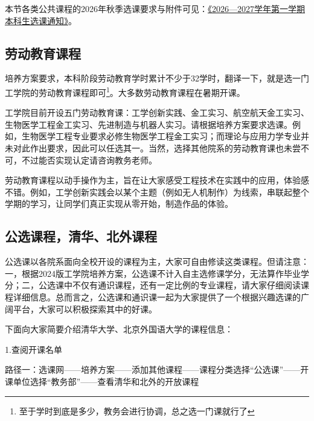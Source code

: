 \documentclass[11pt,oneside]{book}
\begin{document}
本节各类公共课程的2026年秋季选课要求与附件可见：\href{https://dean.pku.edu.cn/web/notice_details.php?id=751}{《2026—2027学年第一学期本科生选课通知》}。

\subsection{劳动教育课程}
培养方案要求，本科阶段劳动教育学时累计不少于32学时，翻译一下，就是选一门工学院的劳动教育课程即可\footnote{至于学时到底是多少，教务会进行协调，总之选一门课就行了}。大多数劳动教育课程在暑期开课。

\vspace{10pt}

工学院目前开设五门劳动教育课：工学创新实践、金工实习、航空航天金工实习、生物医学工程金工实习、先进制造与机器人实习。请根据培养方案要求选课。例如，生物医学工程专业要求必修生物医学工程金工实习；而理论与应用力学专业并未对此作出要求，因此可以任选其一。当然，选择其他院系的劳动教育课也未尝不可，不过能否实现认定请咨询教务老师。

\vspace{10pt}

劳动教育课程以动手操作为主，旨在让大家感受工程技术在实践中的应用，体验感不错。例如，工学创新实践会以某个主题（例如无人机制作）为线索，串联起整个学期的学习，让同学们真正实现从零开始，制造作品的体验。

\subsection{公选课程，清华、北外课程}
公选课以各院系面向全校开设的课程为主，大家可自由修读这类课程。但请注意：一，根据2024版工学院培养方案，公选课不计入自主选修课学分，无法算作毕业学分；二，公选课中不仅有通识课程，还有一定比例的专业课程，请大家仔细阅读课程详细信息。总而言之，公选课和通识课一起为大家提供了一个根据兴趣选课的广阔平台，大家可以积极探索其中的好课。

\vspace{10pt}

下面向大家简要介绍清华大学、北京外国语大学的课程信息：

\vspace{10pt}

1.查阅开课名单

\vspace{10pt}

路径一：选课网——培养方案——添加其他课程——课程分类选择“公选课”——开课单位选择“教务部”——查看清华和北外的开放课程

\vspace{10pt}
\end{document}
